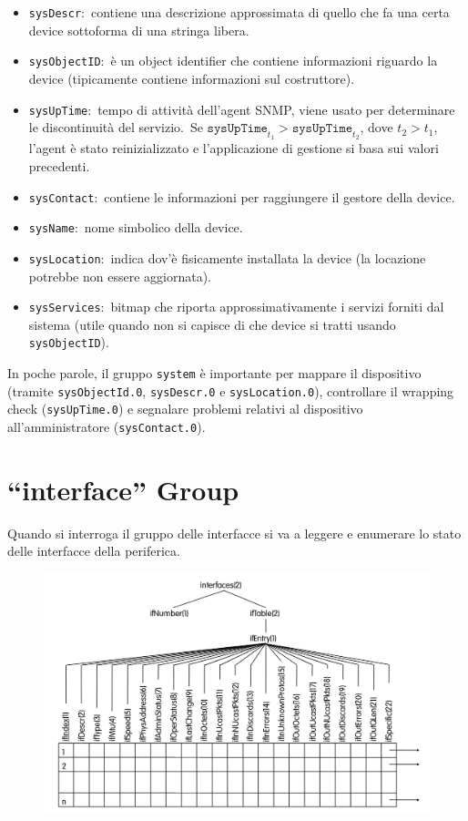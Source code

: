 \begin{itemize}
    \item\texttt{sysDescr}:\ contiene una descrizione approssimata di quello che fa una certa device sottoforma di una stringa libera.
    \item \texttt{sysObjectID}:\ è un object identifier che contiene informazioni riguardo la device (tipicamente contiene informazioni sul costruttore).
    \item \texttt{sysUpTime}:\ tempo di attività dell'agent SNMP, viene usato per determinare le discontinuità del servizio.\ Se $\mathtt{sysUpTime}_{t_1} > \mathtt{sysUpTime}_{t_2}$, dove $t_2 > t_1$, l'agent è stato reinizializzato e l'applicazione di gestione si basa sui valori precedenti.\
    \item \texttt{sysContact}:\ contiene le informazioni per raggiungere il gestore della device.
    \item \texttt{sysName}:\ nome simbolico della device.
    \item \texttt{sysLocation}:\ indica dov'è fisicamente installata la device (la locazione potrebbe non essere aggiornata).
    \item \texttt{sysServices}:\ bitmap che riporta approssimativamente i servizi forniti dal sistema (utile quando non si capisce di che device si tratti usando \texttt{sysObjectID}).
\end{itemize}

\noindent In poche parole, il gruppo \texttt{system} è importante per mappare il dispositivo (tramite \texttt{sysObjectId.0}, \texttt{sysDescr.0} e \texttt{sysLocation.0}), controllare il wrapping check (\texttt{sysUpTime.0}) e segnalare problemi relativi al dispositivo all'amministratore (\texttt{sysContact.0}).

\section{``interface'' Group}

Quando si interroga il gruppo delle interfacce si va a leggere e enumerare lo stato delle interfacce della periferica.

\begin{figure}[H]
    \centering
    \includegraphics[width=\textwidth]{immagini/interface_group.png}
\end{figure}


